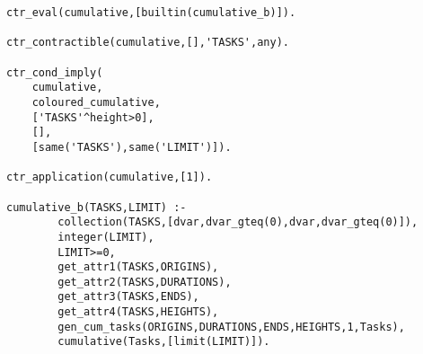 \begin{verbatim}
ctr_eval(cumulative,[builtin(cumulative_b)]).

ctr_contractible(cumulative,[],'TASKS',any).

ctr_cond_imply(
    cumulative,
    coloured_cumulative,
    ['TASKS'^height>0],
    [],
    [same('TASKS'),same('LIMIT')]).

ctr_application(cumulative,[1]).

cumulative_b(TASKS,LIMIT) :-
        collection(TASKS,[dvar,dvar_gteq(0),dvar,dvar_gteq(0)]),
        integer(LIMIT),
        LIMIT>=0,
        get_attr1(TASKS,ORIGINS),
        get_attr2(TASKS,DURATIONS),
        get_attr3(TASKS,ENDS),
        get_attr4(TASKS,HEIGHTS),
        gen_cum_tasks(ORIGINS,DURATIONS,ENDS,HEIGHTS,1,Tasks),
        cumulative(Tasks,[limit(LIMIT)]).

\end{verbatim}
